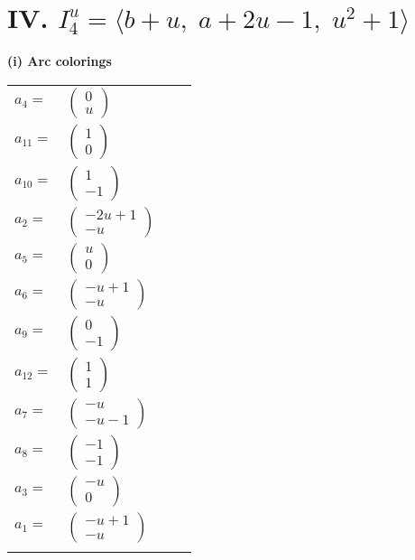 \documentclass[1p]{elsarticle_modified}
\theoremstyle{definition}
\begin{document}
\centering \section*{IV. $I^u_{4}= \langle b+u,\;a+2 u-1,\;u^2+1 \rangle$}
\flushleft \textbf{(i) Arc colorings}\\
\begin{tabular}{m{7pt} m{180pt} m{7pt} m{180pt} }
\flushright $a_{4}=$&$\begin{pmatrix}0\\u\end{pmatrix}$ \\
\flushright $a_{11}=$&$\begin{pmatrix}1\\0\end{pmatrix}$ \\
\flushright $a_{10}=$&$\begin{pmatrix}1\\-1\end{pmatrix}$ \\
\flushright $a_{2}=$&$\begin{pmatrix}-2 u+1\\- u\end{pmatrix}$ \\
\flushright $a_{5}=$&$\begin{pmatrix}u\\0\end{pmatrix}$ \\
\flushright $a_{6}=$&$\begin{pmatrix}- u+1\\- u\end{pmatrix}$ \\
\flushright $a_{9}=$&$\begin{pmatrix}0\\-1\end{pmatrix}$ \\
\flushright $a_{12}=$&$\begin{pmatrix}1\\1\end{pmatrix}$ \\
\flushright $a_{7}=$&$\begin{pmatrix}- u\\- u-1\end{pmatrix}$ \\
\flushright $a_{8}=$&$\begin{pmatrix}-1\\-1\end{pmatrix}$ \\
\flushright $a_{3}=$&$\begin{pmatrix}- u\\0\end{pmatrix}$ \\
\flushright $a_{1}=$&$\begin{pmatrix}- u+1\\- u\end{pmatrix}$\\&\end{tabular}
\end{document}
